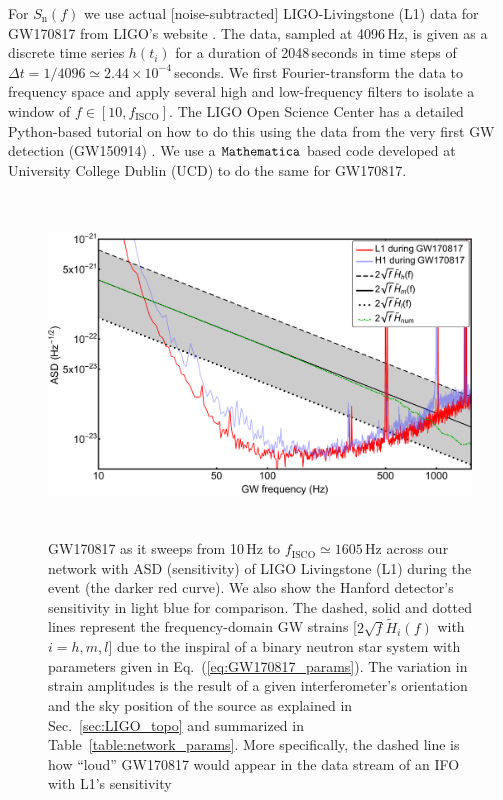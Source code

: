 \documentclass[prd,amsmath,amssymb,aps,floats,amsfonts,notitlepage,superscriptaddress,eqsecnum,nofootinbib,10pt]{revtex4-1}
\begin{document}
For $S_\text{n}(f)$ we use actual [noise-subtracted] LIGO-Livingstone (L1) data for GW170817 from LIGO's website \cite{LIGO_L1_data}.
The data, sampled at 4096\,Hz, is given as a discrete time series $h(t_i)$ for a duration of 2048\,seconds in time steps of $\Delta t=1/4096\simeq 2.44\times 10^{-4}\,$seconds.
We first Fourier-transform the data to frequency space and apply several high and low-frequency filters to isolate a window of $f\in [10, f_\text{ISCO}]$.
The LIGO Open Science Center has a detailed Python-based tutorial on how to do this using the data from the very first GW detection (GW150914) \cite{LIGO_tutorial}. 
We use a $\verb|Mathematica|$ based code developed at University College Dublin (UCD) to do the same for GW170817.
%
\begin{figure}[ht!]
\includegraphics[height=9cm]{../Figures/GW170817_strains.pdf}
\caption{GW170817 as it sweeps from 10\,Hz to $f_\text{ISCO} \simeq1605\,$Hz across our network with ASD (sensitivity) of 
LIGO Livingstone (L1) during the event (the darker red curve).
We also show the Hanford detector's sensitivity in light blue for comparison. The dashed, solid and dotted lines represent the 
frequency-domain GW strains [$2\sqrt{f} \tilde{H}_i(f)$ with $i=h,m,l$] due to the inspiral of
a binary neutron star system with parameters given in Eq.~(\ref{eq:GW170817_params}).
The variation in strain amplitudes is the result of a given interferometer's orientation and the sky position of the source 
as explained in Sec.~\ref{sec:LIGO_topo} and summarized in Table~\ref{table:network_params}.
More specifically, the dashed line is how ``loud'' GW170817 would appear in the data stream of an IFO with L1's sensitivity
}
\end{figure}
\end{document}
